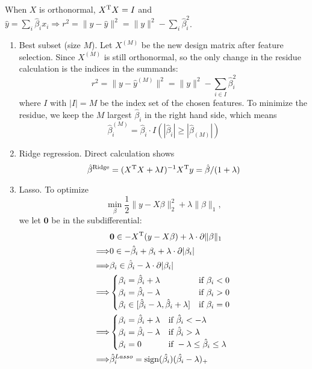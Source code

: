 \begin{sol}
When $X$ is orthonormal, $X^{\mathrm{T}}X=I$ and $\hat{y}=\sum_i\hat{\beta}_ix_i\Rightarrow r^2=\|y-\hat{y}\|^2=\|y\|^2-\sum_i \hat{\beta}_i^2$.
\begin{enumerate}
	\item Best subset (size $M$). Let $X^{(M)}$ be the new design matrix after feature selection. Since $X^{(M)}$ is still orthonormal, so the only change in the residue calculation is the indices in the summands:
	\[
	r^2=\|y-\hat{y}^{(M)}\|^2=\|y\|^2-\sum_{i\in I} \hat{\beta}_i^2
	\]
	where $I$ with $|I|=M$ be the index set of the chosen features. To minimize the residue, we keep the $M$ largest $\hat{\beta}_i$ in the right hand side, which means
	\[
	\hat{\beta}_i^{(M)}=\hat{\beta}_i\cdot I(|\hat{\beta}_i|\ge |\hat{\beta}_{(M)}|)
	\]
	\item Ridge regression. Direct calculation shows
	\[
	\hat{\beta}^{\mathrm{Ridge}}=(X^{\mathrm{T}}X+\lambda I)^{-1}X^{\mathrm{T}}y=\hat{\beta}/(1+\lambda)
	\]
	\item Lasso. To optimize
	\[
	\min_\beta \frac{1}{2}\|y-X\beta\|_2^2+\lambda \|\beta\|_1,
	\] 
	we let $\bm{0}$ be in the subdifferential:
	\begin{align*}
	&\bm{0}\in-X^{\mathrm{T}}(y-X\beta)+\lambda\cdot\partial\|\beta\|_1\\
	\Longrightarrow & 0\in -\hat{\beta}_i+\beta_i+\lambda\cdot\partial|\beta_i|\\
	\Longrightarrow & \beta_i\in\hat{\beta}_i-\lambda\cdot\partial|\beta_i|\\
	\Longrightarrow & \begin{cases}
	\beta_i=\hat{\beta}_i+\lambda & \mbox{if } \beta_i<0\\
	\beta_i=\hat{\beta}_i-\lambda & \mbox{if } \beta_i>0\\
	\beta_i\in[\hat{\beta}_i-\lambda, \hat{\beta}_i+\lambda] & \mbox{if } \beta_i=0
	\end{cases}\\
	\Longrightarrow & \begin{cases}
	\beta_i=\hat{\beta}_i+\lambda & \mbox{if } \hat{\beta}_i<-\lambda\\
	\beta_i=\hat{\beta}_i-\lambda & \mbox{if } \hat{\beta}_i>\lambda\\
	\beta_i=0 & \mbox{if }-\lambda\le\hat{\beta}_i\le\lambda
	\end{cases}\\
	\Longrightarrow & \hat{\beta}_i^{Lasso}=\operatorname{sign}(\hat{\beta_i})(\hat{\beta_i}-\lambda)_+
	\end{align*}
\end{enumerate}
\end{sol}

